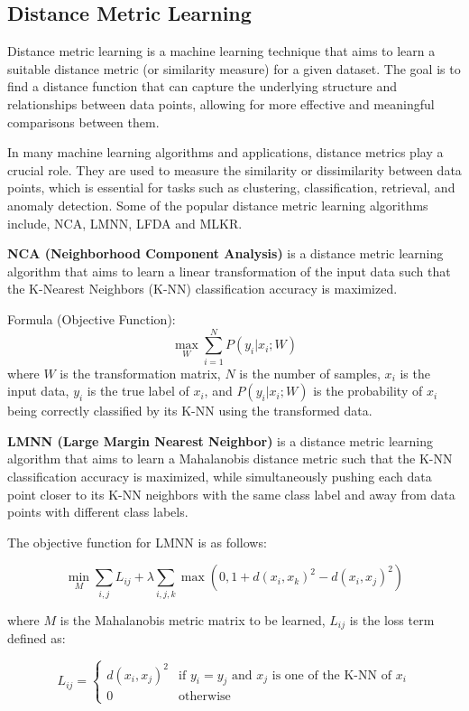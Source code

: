 \documentclass[12pt,a4paper]{article}
\begin{document}
\subsection{Distance Metric Learning}
Distance metric learning is a machine learning technique that aims to learn a suitable distance metric (or similarity measure) for a given dataset. The goal is to find a distance function that can capture the underlying structure and relationships between data points, allowing for more effective and meaningful comparisons between them.

In many machine learning algorithms and applications, distance metrics play a crucial role. They are used to measure the similarity or dissimilarity between data points, which is essential for tasks such as clustering, classification, retrieval, and anomaly detection. Some of the popular distance metric learning algorithms include, NCA, LMNN, LFDA and MLKR.

\textbf{NCA (Neighborhood Component Analysis)}
is a distance metric learning algorithm that aims to learn a linear transformation of the input data such that the K-Nearest Neighbors (K-NN) classification accuracy is maximized.

Formula (Objective Function):
\[
\max_{W} \sum_{i=1}^{N} P(y_i|x_i;W)
\]
where \(W\) is the transformation matrix, \(N\) is the number of samples, \(x_i\) is the input data, \(y_i\) is the true label of \(x_i\), and \(P(y_i|x_i;W)\) is the probability of \(x_i\) being correctly classified by its K-NN using the transformed data.

\textbf{LMNN (Large Margin Nearest Neighbor)}
is a distance metric learning algorithm that aims to learn a Mahalanobis distance metric such that the K-NN classification accuracy is maximized, while simultaneously pushing each data point closer to its K-NN neighbors with the same class label and away from data points with different class labels.

The objective function for LMNN is as follows:

\[
\min_{M} \sum_{i,j} L_{ij} + \lambda \sum_{i,j,k} \max(0, 1 + d(x_i, x_k)^2 - d(x_i, x_j)^2)
\]

where \(M\) is the Mahalanobis metric matrix to be learned, \(L_{ij}\) is the loss term defined as:

\[
L_{ij} = \begin{cases}
d(x_i, x_j)^2 & \text{if } y_i = y_j \text{ and } x_j \text{ is one of the K-NN of } x_i \\
0 & \text{otherwise}
\end{cases}
\]
\end{document}
